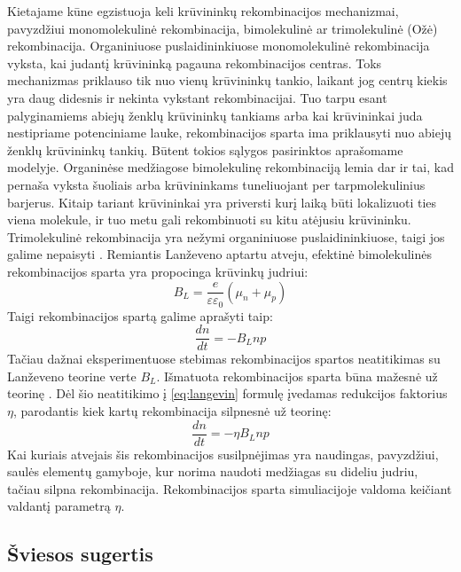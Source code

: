 Kietajame kūne egzistuoja keli krūvininkų rekombinacijos mechanizmai, pavyzdžiui monomolekulinė rekombinacija, bimolekulinė ar trimolekulinė (Ožė) rekombinacija. Organiniuose puslaidininkiuose monomolekulinė rekombinacija vyksta, kai judantį krūvininką pagauna rekombinacijos centras. Toks mechanizmas priklauso tik nuo vienų krūvininkų tankio, laikant jog centrų kiekis yra daug didesnis ir nekinta vykstant rekombinacijai. Tuo tarpu esant palyginamiems abiejų ženklų krūvininkų tankiams arba kai krūvininkai juda nestipriame potenciniame lauke, rekombinacijos sparta ima priklausyti nuo abiejų ženklų krūvininkų tankių. Būtent tokios sąlygos pasirinktos aprašomame modelyje. Organinėse medžiagose bimolekulinę rekombinaciją lemia dar ir tai, kad pernaša vyksta šuoliais arba krūvininkams tuneliuojant per tarpmolekulinius barjerus. Kitaip tariant krūvininkai yra priversti kurį laiką būti lokalizuoti ties viena molekule, ir tuo metu gali rekombinuoti su kitu atėjusiu krūvininku. Trimolekulinė rekombinacija yra nežymi organiniuose puslaidininkiuose, taigi jos galime nepaisyti \cite{juška:143303,juška:013303}.
Remiantis Lanževeno \cite{langevin} aptartu atveju, efektinė bimolekulinės rekombinacijos sparta yra propocinga krūvinkų judriui:
\begin{equation}
B_L=\frac{e}{\varepsilon \varepsilon_0}(\mu_n+\mu_p)
\end{equation}
Taigi rekombinacijos spartą galime aprašyti taip:
\begin{equation} \label{eq:langevin}
\frac{dn}{dt}=-B_L n p
\end{equation}
Tačiau dažnai eksperimentuose stebimas rekombinacijos spartos neatitikimas su Lanževeno teorine verte \(B_L\). Išmatuota rekombinacijos sparta būna mažesnė už teorinę \cite{juška:155202}. Dėl šio neatitikimo į \eqref{eq:langevin} formulę įvedamas redukcijos faktorius \(\eta\), parodantis kiek kartų rekombinacija silpnesnė už teorinę:
\begin{equation}
	\frac{dn}{dt}=-\eta B_L n p
\end{equation}
Kai kuriais atvejais šis rekombinacijos susilpnėjimas yra naudingas, pavyzdžiui, saulės elementų gamyboje, kur norima naudoti medžiagas su dideliu judriu, tačiau silpna rekombinacija.
Rekombinacijos sparta simuliacijoje valdoma keičiant valdantį parametrą \(\eta\).

\subsection{Šviesos sugertis}

